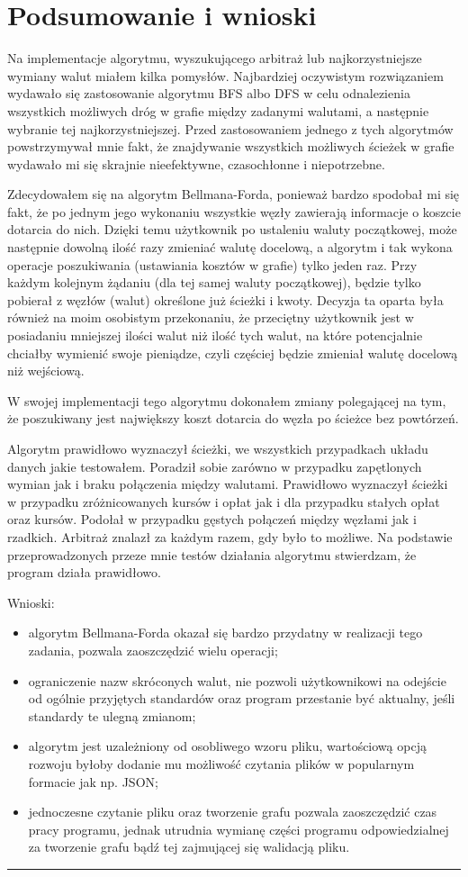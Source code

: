 \documentclass[a4paper,11pt]{article}
\newcommand{\linia}{\rule{\linewidth}{0.4mm}}
\begin{document}
\section{Podsumowanie i wnioski}
Na implementacje algorytmu, wyszukującego arbitraż lub najkorzystniejsze wymiany walut miałem kilka pomysłów. Najbardziej oczywistym rozwiązaniem wydawało się zastosowanie algorytmu BFS albo DFS w celu odnalezienia wszystkich możliwych dróg w grafie między zadanymi walutami, a następnie wybranie tej najkorzystniejszej. Przed zastosowaniem jednego z tych algorytmów powstrzymywał mnie fakt, że znajdywanie wszystkich możliwych ścieżek w grafie wydawało mi się skrajnie nieefektywne, czasochłonne i niepotrzebne.

Zdecydowałem się na algorytm Bellmana-Forda, ponieważ bardzo spodobał mi się fakt, że po jednym jego wykonaniu wszystkie węzły zawierają informacje o koszcie dotarcia do nich. Dzięki temu użytkownik po ustaleniu waluty początkowej, może następnie dowolną ilość razy zmieniać walutę docelową, a algorytm i tak wykona operacje poszukiwania (ustawiania kosztów w grafie) tylko jeden raz. Przy każdym kolejnym żądaniu (dla tej samej waluty początkowej), będzie tylko pobierał z węzłów (walut) określone już ścieżki i kwoty. Decyzja ta oparta była również na moim osobistym przekonaniu, że przeciętny użytkownik jest w posiadaniu mniejszej ilości walut niż ilość tych walut, na które potencjalnie chciałby wymienić swoje pieniądze, czyli częściej będzie zmieniał walutę docelową niż wejściową.

W swojej implementacji tego algorytmu dokonałem zmiany polegającej na tym, że poszukiwany jest największy koszt dotarcia do węzła po ścieżce bez powtórzeń.

Algorytm prawidłowo wyznaczył ścieżki, we wszystkich przypadkach układu danych jakie testowałem. Poradził sobie zarówno w przypadku zapętlonych wymian jak i braku połączenia między walutami. Prawidłowo wyznaczył ścieżki w przypadku zróżnicowanych kursów i opłat jak i dla przypadku stałych opłat oraz kursów. Podołał w przypadku gęstych połączeń między węzłami jak i rzadkich. Arbitraż znalazł za każdym razem, gdy było to możliwe. Na podstawie przeprowadzonych przeze mnie testów działania algorytmu stwierdzam, że program działa prawidłowo.


Wnioski:
\begin{itemize}
\item algorytm Bellmana-Forda okazał się bardzo przydatny w realizacji tego zadania, pozwala zaoszczędzić wielu operacji;
\item ograniczenie nazw skróconych walut, nie pozwoli użytkownikowi na odejście od ogólnie przyjętych standardów oraz program przestanie być aktualny, jeśli standardy te ulegną zmianom;
\item algorytm jest uzależniony od osobliwego wzoru pliku, wartościową opcją rozwoju byłoby dodanie mu możliwość czytania plików w popularnym formacie jak np. JSON;
\item jednoczesne czytanie pliku oraz tworzenie grafu pozwala zaoszczędzić czas pracy programu, jednak utrudnia wymianę części programu odpowiedzialnej za tworzenie grafu bądź tej zajmującej się walidacją pliku.   
\end{itemize}

\noindent\linia
\end{document}
